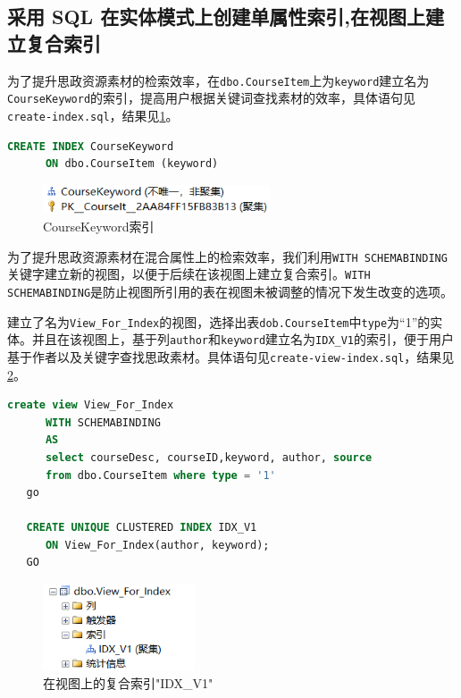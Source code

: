 \documentclass[11pt]{article}
\begin{document}
  \subsection{采用 SQL 在实体模式上创建单属性索引,在视图上建立复合索引}
  为了提升思政资源素材的检索效率，在\verb|dbo.CourseItem|上为\verb|keyword|建立名为\verb|CourseKeyword|的索引，提高用户根据关键词查找素材的效率，具体语句见\verb|create-index.sql|，结果见\ref{fig:index1}。
  \begin{file}
    \begin{lstlisting}[language=sql]
      CREATE INDEX CourseKeyword
      ON dbo.CourseItem (keyword)
    \end{lstlisting}
  \end{file}

  \begin{figure}[h]
    \centering
    \includegraphics[width=0.6\textwidth]{index1.png}
    \caption{CourseKeyword索引}
    \label{fig:index1}
  \end{figure}

  为了提升思政资源素材在混合属性上的检索效率，我们利用\verb|WITH SCHEMABINDING|关键字建立新的视图，以便于后续在该视图上建立复合索引。\verb|WITH SCHEMABINDING|是防止视图所引用的表在视图未被调整的情况下发生改变的选项。

  建立了名为\verb|View_For_Index|的视图，选择出表\verb|dob.CourseItem|中\verb|type|为“1”的实体。并且在该视图上，基于列\verb|author|和\verb|keyword|建立名为\verb|IDX_V1|的索引，便于用户基于作者以及关键字查找思政素材。具体语句见\verb|create-view-index.sql|，结果见\ref{fig:IDX1}。

  \begin{file}
    \begin{lstlisting}[language=sql]
      create view View_For_Index
      WITH SCHEMABINDING
      AS
      select courseDesc, courseID,keyword, author, source 
      from dbo.CourseItem where type = '1'
   go
   
   CREATE UNIQUE CLUSTERED INDEX IDX_V1
      ON View_For_Index(author, keyword);
   GO
    \end{lstlisting}
  \end{file}

  \begin{figure}[h]
    \centering
    \includegraphics[width=0.4\textwidth]{IDX1.png}
    \caption{在视图上的复合索引"IDX\_V1"}
    \label{fig:IDX1}
  \end{figure}
\end{document}

